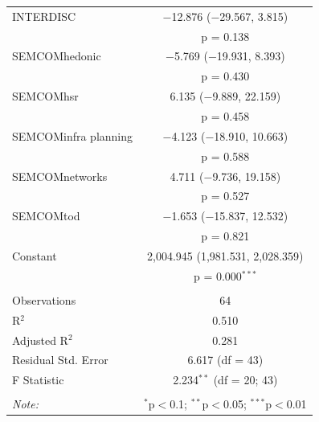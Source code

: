 \begin{table}[!htbp]
\begin{tabular}{@{\extracolsep{5pt}}lc}
  INTERDISC & $-$12.876 ($-$29.567, 3.815) \\ 
  & p = 0.138 \\ 
  SEMCOMhedonic & $-$5.769 ($-$19.931, 8.393) \\ 
  & p = 0.430 \\ 
  SEMCOMhsr & 6.135 ($-$9.889, 22.159) \\ 
  & p = 0.458 \\ 
  SEMCOMinfra planning & $-$4.123 ($-$18.910, 10.663) \\ 
  & p = 0.588 \\ 
  SEMCOMnetworks & 4.711 ($-$9.736, 19.158) \\ 
  & p = 0.527 \\ 
  SEMCOMtod & $-$1.653 ($-$15.837, 12.532) \\ 
  & p = 0.821 \\ 
  Constant & 2,004.945 (1,981.531, 2,028.359) \\ 
  & p = 0.000$^{***}$ \\ 
 \hline \\[-1.8ex] 
Observations & 64 \\ 
R$^{2}$ & 0.510 \\ 
Adjusted R$^{2}$ & 0.281 \\ 
Residual Std. Error & 6.617 (df = 43) \\ 
F Statistic & 2.234$^{**}$ (df = 20; 43) \\ 
\hline 
\hline \\[-1.8ex] 
\textit{Note:}  & \multicolumn{1}{r}{$^{*}$p$<$0.1; $^{**}$p$<$0.05; $^{***}$p$<$0.01} \\ 
\end{tabular} 
\end{table} 









